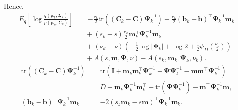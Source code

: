 \documentclass[a4paper]{article}
\begin{document}
			Hence,
			\begin{align}
				E_q\left[ \log\frac{q(\bm{\mu}_k, \bm{\Sigma}_k)}{p(\bm{\mu}_k, \bm{\Sigma}_k)} \right]
				&= -\frac{\nu_k}{2}\text{tr}\left((\mathbf{C}_k - \mathbf{C})\bm{\Psi}_k^{-1}\right)
				- \frac{\nu_k}{2}(\mathbf{b}_k - \mathbf{b})^\top \bm{\Psi}_k^{-1}\mathbf{m}_k \\
				&\quad + (s_k - s) \frac{\nu_k}{2} \mathbf{m}_k^\top \bm{\Psi}_k^{-1} \mathbf{m}_k \\
				&\quad + (\nu_k - \nu) \left( -\frac{1}{2} \log |\bm{\Psi}_k| + \log 2 + \frac{1}{2} \psi_D\left( \frac{\nu_k}{2} \right) \right) \\
				&\quad + A(s, \mathbf{m}, \bm{\Psi}, \nu) - A(s_k, \mathbf{m}_k, \bm{\Psi}_k, \nu_k).
			\end{align}
			\begin{align}
				\text{tr}\left((\mathbf{C}_k - \mathbf{C})\bm{\Psi}_k^{-1}\right)
				&= \text{tr}\left( \mathbf{I} + \mathbf{m}_k\mathbf{m}_k^\top\bm{\Psi}_k^{-1} - \bm{\Psi}\bm{\Psi}_k^{-1} - \mathbf{m}\mathbf{m}^\top\bm{\Psi}_k^{-1} \right) \\
				&= D + \mathbf{m}_k\bm{\Psi}_k^{-1}\mathbf{m}_k^\top - \text{tr}(\bm{\Psi}\bm{\Psi}_k^{-1}) - \mathbf{m}^\top\bm{\Psi}_k^{-1}\mathbf{m}, \\
				(\mathbf{b}_k - \mathbf{b})^\top \bm{\Psi}_k^{-1} \mathbf{m}_k
				&= -2 (s_k\mathbf{m}_k - s\mathbf{m})^\top \bm{\Psi}_k^{-1} \mathbf{m}_k.
			\end{align}

	
	
\end{document}
